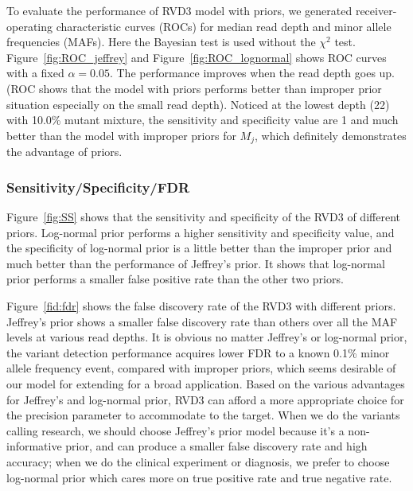 \documentclass[11pt,reqno]{amsart}
\begin{document}
To evaluate the performance of RVD3 model with priors, we generated receiver-operating characteristic curves (ROCs) for median read depth and minor allele frequencies (MAFs).
Here the Bayesian test is used without the $\chi^2$ test. Figure~\ref{fig:ROC_jeffrey} and Figure~\ref{fig:ROC_lognormal} shows ROC curves with a fixed $\alpha=0.05$.
The performance improves when the read depth goes up. (ROC shows that the model with priors performs better than improper prior situation especially on the small read depth).
Noticed at the lowest depth (22) with 10.0\% mutant mixture, the sensitivity and specificity value are 1 and much better than the model with improper priors for $M_j$, which definitely demonstrates the advantage of priors.

\subsubsection{Sensitivity/Specificity/FDR}

Figure~\ref{fig:SS} shows that the sensitivity and specificity of the RVD3 of different priors.
Log-normal prior performs a higher sensitivity and specificity value, and the specificity of log-normal prior is a little better than the improper prior and much better than the performance of Jeffrey's prior.
It shows that log-normal prior performs a smaller false positive rate than the other two priors.

Figure~\ref{fid:fdr} shows the false discovery rate of the RVD3 with different priors. Jeffrey's prior shows a smaller false discovery rate than others over all the MAF levels at various read depths.
It is obvious no matter Jeffrey's or log-normal prior, the variant detection performance acquires lower FDR to a known 0.1\% minor allele frequency event, compared with improper priors, which seems desirable of our model for extending for a broad application.
Based on the various advantages for Jeffrey's and log-normal prior, RVD3 can afford a more appropriate choice for the precision parameter to accommodate to the target. When we do the variants calling research, we should choose Jeffrey's prior model because it's a non-informative prior, and can produce a smaller false discovery rate and high accuracy; when we do the clinical experiment or diagnosis, we prefer to choose log-normal prior which cares more on true positive rate and true negative rate.
\end{document}
